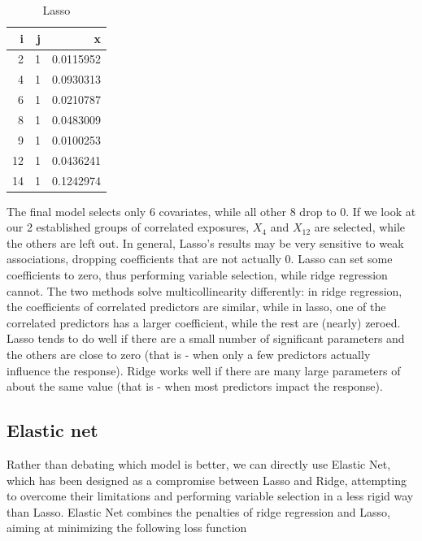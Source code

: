 \documentclass[
]{book}
\begin{document}
\begin{table}

\caption{\label{tab:unnamed-chunk-17}Lasso}
\centering
\begin{tabular}[t]{r|r|r}
\hline
i & j & x\\
\hline
2 & 1 & 0.0115952\\
\hline
4 & 1 & 0.0930313\\
\hline
6 & 1 & 0.0210787\\
\hline
8 & 1 & 0.0483009\\
\hline
9 & 1 & 0.0100253\\
\hline
12 & 1 & 0.0436241\\
\hline
14 & 1 & 0.1242974\\
\hline
\end{tabular}
\end{table}

The final model selects only 6 covariates, while all other 8 drop to 0. If we look at our 2 established groups of correlated exposures, \(X_4\) and \(X_{12}\) are selected, while the others are left out. In general, Lasso's results may be very sensitive to weak associations, dropping coefficients that are not actually 0. Lasso can set some coefficients to zero, thus performing variable selection, while ridge regression cannot. The two methods solve multicollinearity differently: in ridge regression, the coefficients of correlated predictors are similar, while in lasso, one of the correlated predictors has a larger coefficient, while the rest are (nearly) zeroed. Lasso tends to do well if there are a small number of significant parameters and the others are close to zero (that is - when only a few predictors actually influence the response). Ridge works well if there are many large parameters of about the same value (that is - when most predictors impact the response).

\hypertarget{elastic-net}{%
\subsection{Elastic net}\label{elastic-net}}

Rather than debating which model is better, we can directly use Elastic Net, which has been designed as a compromise between Lasso and Ridge, attempting to overcome their limitations and performing variable selection in a less rigid way than Lasso. Elastic Net combines the penalties of ridge regression and Lasso, aiming at minimizing the following loss function
\end{document}
